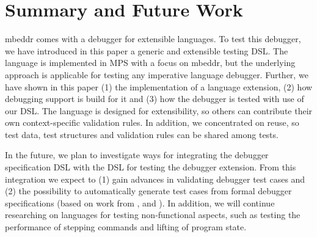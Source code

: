 \section{Summary and Future Work}

mbeddr comes with a debugger for extensible languages.
To test this debugger, we have introduced in this paper a generic and extensible
testing \ac{DSL}.
The language is implemented in \ac{MPS} with a focus on mbeddr, but the
underlying approach is applicable for testing any imperative language debugger. Further, we
have shown in this paper (1) the implementation of a language extension, (2) how
debugging support is build for it and (3) how the debugger is tested with use of
our \ac{DSL}. The language is designed for extensibility, so others can contribute
their own context-specific validation rules. In addition, we concentrated on
reuse, so test data, test structures and validation rules can be shared among
tests.

In the future, we plan to investigate ways for integrating the debugger
specification \ac{DSL} with the \ac{DSL} for testing the debugger extension. From this
integration we expect to (1) gain advances in validating debugger test cases and
(2) the possibility to automatically generate test cases from formal debugger
specifications (based on work
from \cite{conf/kbse/WuG05}, \cite{henriques05} and \cite{journals/spe/WuGM08}).
In addition, we will continue
researching on languages for testing non-functional aspects, such as testing the
performance of stepping commands and lifting of program state.